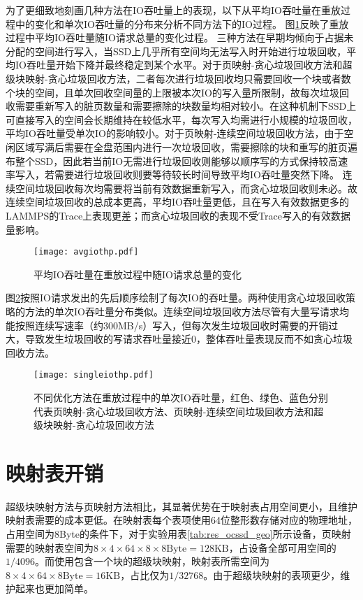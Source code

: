 为了更细致地刻画几种方法在IO吞吐量上的表现，以下从平均IO吞吐量在重放过程中的变化和单次IO吞吐量的分布来分析不同方法下的IO过程。
图\ref{fig:res_ioavg}反映了重放过程中平均IO吞吐量随IO请求总量的变化过程。
三种方法在早期均倾向于占据未分配的空间进行写入，当SSD上几乎所有空间均无法写入时开始进行垃圾回收，平均IO吞吐量开始下降并最终稳定到某个水平。对于页映射-贪心垃圾回收方法和超级块映射-贪心垃圾回收方法，二者每次进行垃圾回收均只需要回收一个块或者数个块的空间，且单次回收空间量的上限被本次IO的写入量所限制，故每次垃圾回收需要重新写入的脏页数量和需要擦除的块数量均相对较小。在这种机制下SSD上可直接写入的空间会长期维持在较低水平，每次写入均需进行小规模的垃圾回收，平均IO吞吐量受单次IO的影响较小。对于页映射-连续空间垃圾回收方法，由于空闲区域写满后需要在全盘范围内进行一次垃圾回收，需要擦除的块和重写的脏页遍布整个SSD，因此若当前IO无需进行垃圾回收则能够以顺序写的方式保持较高速率写入，若需要进行垃圾回收则要等待较长时间导致平均IO吞吐量突然下降。
连续空间垃圾回收每次均需要将当前有效数据重新写入，而贪心垃圾回收则未必。故连续空间垃圾回收的总成本更高，平均IO吞吐量更低，且在写入有效数据更多的LAMMPS的Trace上表现更差；而贪心垃圾回收的表现不受Trace写入的有效数据量影响。

\begin{figure}[H]
    \centering
    \texttt{[image: avgiothp.pdf]}
    \caption{平均IO吞吐量在重放过程中随IO请求总量的变化}
    \label{fig:res_ioavg}
\end{figure}

图\ref{fig:res_ioingle}按照IO请求发出的先后顺序绘制了每次IO的吞吐量。两种使用贪心垃圾回收策略的方法的单次IO吞吐量分布类似。连续空间垃圾回收方法尽管有大量写请求均能按照连续写速率（约300MB/s）写入，但每次发生垃圾回收时需要的开销过大，导致发生垃圾回收的写请求吞吐量接近0，整体吞吐量表现反而不如贪心垃圾回收方法。

\begin{figure}[H]
    \centering
    \texttt{[image: singleiothp.pdf]}
    \caption[不同优化方法在重放过程中的单次IO吞吐量]{不同优化方法在重放过程中的单次IO吞吐量，红色、绿色、蓝色分别代表页映射-贪心垃圾回收方法、页映射-连续空间垃圾回收方法和超级块映射-贪心垃圾回收方法}
    \label{fig:res_ioingle}
\end{figure}

\section{映射表开销}

超级块映射方法与页映射方法相比，其显著优势在于映射表占用空间更小，且维护映射表需要的成本更低。在映射表每个表项使用64位整形数存储对应的物理地址，占用空间为8Byte的条件下，对于实验用表\ref{tab:res_ocssd_geo}所示设备，页映射需要的映射表空间为$8\times 4\times 64\times 8\times 8\mathrm{Byte}=128\mathrm{KB}$，占设备全部可用空间的$1/4096$。而使用包含一个块的超级块映射，映射表所需空间为$8\times 4\times 64\times 8\mathrm{Byte}=16\mathrm{KB}$，占比仅为$1/32768$。由于超级块映射的表项更少，维护起来也更加简单。

